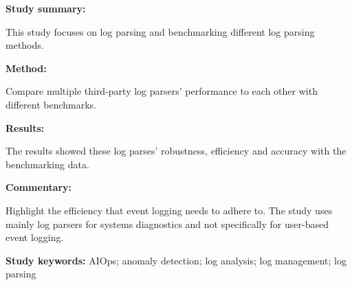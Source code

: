 \begin{tcolorbox}[colback=gray!5!white, colframe=pastelgreen!40!black, title=Tools and Benchmarks for Automated Log Parsing\cite{Zhu2019}]
	\begin{minipage}[t]{0.25\textwidth}
		\textbf{Study summary:}
	\end{minipage}
	\hfill
	\begin{minipage}[t]{0.65\textwidth}
		This study focuses on log parsing and benchmarking different log parsing methods. 
	\end{minipage}

	\vspace{0.75em} 

	\begin{minipage}[t]{0.25\textwidth}
		\textbf{Method:}
	\end{minipage}
	\hfill
	\begin{minipage}[t]{0.65\textwidth}
		Compare multiple third-party log parsers' performance to each other with different benchmarks.
	\end{minipage}

	\vspace{0.75em} 

	\begin{minipage}[t]{0.25\textwidth}
		\textbf{Results:}
	\end{minipage}
	\hfill
	\begin{minipage}[t]{0.65\textwidth}
		The results showed these log parses' robustness, efficiency and accuracy with the benchmarking data.
	\end{minipage}

	\vspace{0.75em} 

	\begin{minipage}[t]{0.25\textwidth}
		\textbf{Commentary:}
	\end{minipage}
	\hfill
	\begin{minipage}[t]{0.65\textwidth}
		Highlight the efficiency that event logging needs to adhere to. The study uses mainly log
		parsers for systems diagnostics and not specifically for user-based event logging.
	\end{minipage}
	\tcblower
	\textbf{Study keywords:} AIOps; anomaly detection; log analysis; log management; log parsing
\end{tcolorbox}

